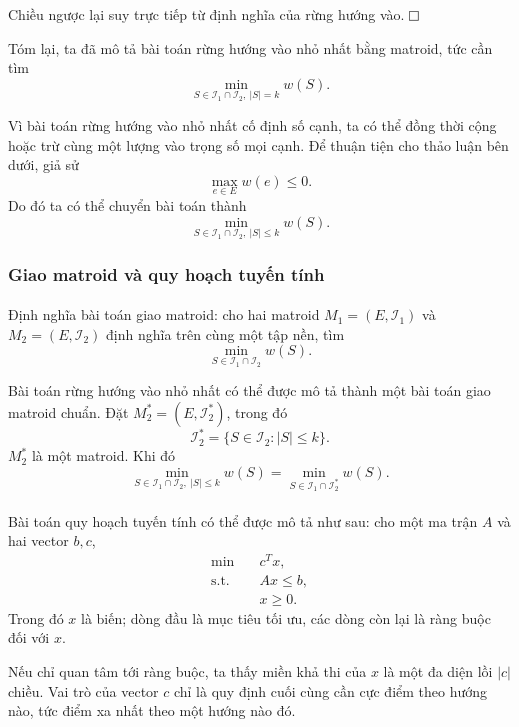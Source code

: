 \documentclass[11pt]{article}
\newcommand{\proofbox}{\ensuremath{\vcenter{\hrule height 0.45pt
  \hbox{\vrule width 0.45pt height 6pt\kern 6pt\vrule width 0.45pt}
  \hrule height 0.45pt}}}
\begin{document}
Chiều ngược lại suy trực tiếp từ định nghĩa của rừng hướng vào. \proofbox

Tóm lại, ta đã mô tả bài toán rừng hướng vào nhỏ nhất bằng matroid, tức cần tìm
\[
\min_{S\in\mathcal{I}_1\cap\mathcal{I}_2,\ |S|=k} w(S).
\]

Vì bài toán rừng hướng vào nhỏ nhất cố định số cạnh, ta có thể đồng thời cộng
hoặc trừ cùng một lượng vào trọng số mọi cạnh. Để thuận tiện cho thảo luận bên
dưới, giả sử
\[
\max_{e\in E}w(e)\le 0.
\]
Do đó ta có thể chuyển bài toán thành
\[
\min_{S\in\mathcal{I}_1\cap\mathcal{I}_2,\ |S|\le k} w(S).
\]

\subsubsection{Giao matroid và quy hoạch tuyến tính}

\paragraph{}
Định nghĩa bài toán giao matroid: cho hai matroid \(M_1=(E,\mathcal{I}_1)\) và
\(M_2=(E,\mathcal{I}_2)\) định nghĩa trên cùng một tập nền, tìm
\[
\min_{S\in\mathcal{I}_1\cap\mathcal{I}_2}w(S).
\]

Bài toán rừng hướng vào nhỏ nhất có thể được mô tả thành một bài toán giao
matroid chuẩn. Đặt \(M_2^*=(E,\mathcal{I}_2^*)\), trong đó
\[
\mathcal{I}_2^*=\{S\in\mathcal{I}_2: |S|\le k\}.
\]
\(M_2^*\) là một matroid. Khi đó
\[
\min_{S\in\mathcal{I}_1\cap\mathcal{I}_2,\ |S|\le k}w(S)
=\min_{S\in\mathcal{I}_1\cap\mathcal{I}_2^*}w(S).
\]

\paragraph{}
Bài toán quy hoạch tuyến tính có thể được mô tả như sau: cho một ma trận \(A\)
và hai vector \(b,c\),
\[
\begin{aligned}
\min\quad &c^Tx,\\
\text{s.t.}\quad &Ax\le b,\\
&x\ge 0.
\end{aligned}
\]
Trong đó \(x\) là biến; dòng đầu là mục tiêu tối ưu, các dòng còn lại là ràng
buộc đối với \(x\).

Nếu chỉ quan tâm tới ràng buộc, ta thấy miền khả thi của \(x\) là một đa diện
lồi \(|c|\) chiều. Vai trò của vector \(c\) chỉ là quy định cuối cùng cần cực
điểm theo hướng nào, tức điểm xa nhất theo một hướng nào đó.
\end{document}
